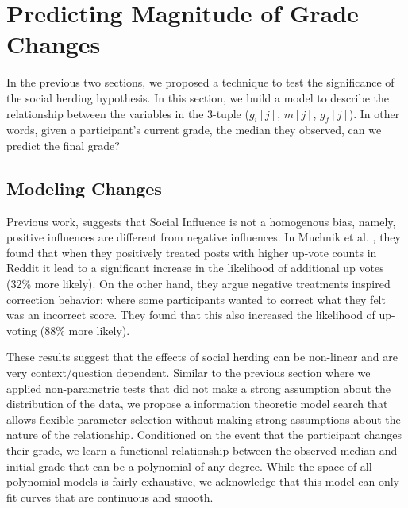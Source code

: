 \section{Predicting Magnitude of Grade Changes}
\label{changemod}
In the previous two sections, we proposed a technique to test the significance of the social herding hypothesis.
In this section, we build a model to describe the relationship between the variables in the 3-tuple ($g_i[j]$, $m[j]$, $g_f[j]$).
In other words, given a participant's current grade, the median they observed, can we predict the final grade?

\subsection{Modeling Changes}
Previous work, suggests that Social Influence is not a homogenous bias, namely, positive influences are different from negative influences.
In Muchnik et al. \cite{muchnik2013social}, they found that when they positively treated posts with higher up-vote counts in Reddit it lead to a significant increase in the likelihood of additional up votes (32\% more likely). 
On the other hand, they argue negative treatments inspired correction behavior; where some participants wanted to correct what they felt was an incorrect score. 
They found that this also increased the likelihood of up-voting (88\% more likely).

These results suggest that the effects of social herding can be non-linear and are very context/question dependent.
Similar to the previous section where we applied non-parametric tests that did not make a strong assumption about the distribution of the data, we propose a information theoretic model search that allows flexible parameter selection without making strong assumptions about the nature of the relationship.
Conditioned on the event that the participant changes their grade, we learn a functional relationship between the observed median and initial grade that can be a polynomial of any degree.
While the space of all polynomial models is fairly exhaustive, we acknowledge that this model can only fit curves that are continuous and smooth.

